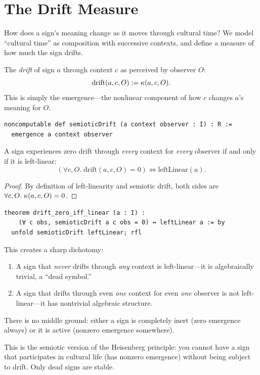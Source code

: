 \section{The Drift Measure}

How does a sign's meaning change as it moves through cultural time?
We model ``cultural time'' as composition with successive contexts,
and define a measure of how much the sign drifts.

\begin{definition}
The \emph{drift} of sign $a$ through context $c$ as perceived by
observer $O$:
\[
  \mathrm{drift}(a, c, O) := \kappa(a, c, O).
\]
This is simply the emergence---the nonlinear component of how $c$
changes $a$'s meaning for $O$.
\end{definition}

\begin{lstlisting}
noncomputable def semioticDrift (a context observer : I) : R :=
  emergence a context observer
\end{lstlisting}

\begin{theorem}
\label{thm:zero-drift}
A sign experiences zero drift through \emph{every} context for
\emph{every} observer if and only if it is left-linear:
\[
  (\forall c, O.\; \mathrm{drift}(a, c, O) = 0) \iff \mathrm{leftLinear}(a).
\]
\end{theorem}

\begin{proof}
By definition of left-linearity and semiotic drift, both sides
are $\forall c, O.\; \kappa(a, c, O) = 0$.
\end{proof}

\begin{lstlisting}
theorem drift_zero_iff_linear (a : I) :
    (∀ c obs, semioticDrift a c obs = 0) ↔ leftLinear a := by
  unfold semioticDrift leftLinear; rfl
\end{lstlisting}

\begin{remark}
This creates a sharp dichotomy:
\begin{enumerate}
\item A sign that \emph{never} drifts through \emph{any} context is
  left-linear---it is algebraically trivial, a ``dead symbol.''
\item A sign that drifts through even \emph{one} context for even
  \emph{one} observer is not left-linear---it has nontrivial algebraic
  structure.
\end{enumerate}
There is no middle ground: either a sign is completely inert (zero
emergence always) or it is active (nonzero emergence somewhere).

This is the semiotic version of the Heisenberg principle: you cannot
have a sign that participates in cultural life (has nonzero emergence)
without being subject to drift.  Only dead signs are stable.
\end{remark}

